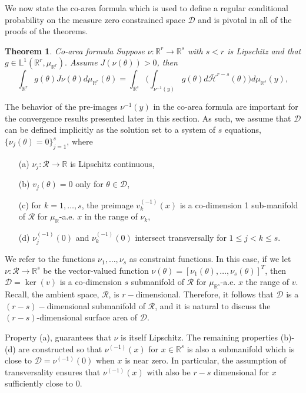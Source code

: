 \documentclass[10pt,fleqn]{article} \pdfoutput=1
\newtheorem{theorem}{Theorem} \newtheorem{lemma}{Lemma}
\DeclareMathOperator{\1}{\mathbbm{1}} \DeclareMathOperator{\bigO}{\mc O}
\begin{document}
We now state the co-area formula which is used to define a regular
conditional probability on the measure zero constrained space $\mathcal{D}$
and is pivotal in all of the proofs of the theorems.
\begin{theorem}{Co-area formula \citep{diaconis2013manifold,
			federer2014geometric}} Suppose $\nu:\mathbb{R}^r\to\mathbb{R}^s$
	with $ s<r$ is Lipschitz and that
	$g\in\mathbb{L}^1(\mathbb{R}^r,\mu_{\mathbb{R}^r}).$ Assume
	$J(\nu(\theta))>0$, then \begin{equation} \int_{\mathbb{R}^r}
		g(\theta)J\nu(\theta)d\mu_{\mathbb{R}^r}( \theta)=
		\int_{\mathbb{R}^s} \bigg( \int_{\nu^{-1}(y)}g(\theta)
		d\bar{\mathcal{H}}^{r-s}(\theta)\bigg)d\mu_{\mathbb{R}^s}(y),
	\end{equation} \end{theorem} The behavior of the pre-images
$\nu^{-1}(y)$ in the co-area formula are important for the
convergence results presented later in this section.  As such, we assume that $\mathcal{D}$ can be defined implicitly as the
solution set to a system of $s$ equations,  $\{\nu_j(\theta)=0\}_{j=1}^s$,
where \begin{itemize} \item[(a)] $\nu_j:\mathcal{R}\to\mathbb{R}$ is
	      Lipschitz continuous, \item[(b)] $v_j(\theta)=0$ only for
	      $\theta\in\mathcal{D}$, \item[(c)] for $k=1,\dots, s$, the preimage
	      $v_k^{(-1)}(x)$ is a co-dimension 1 sub-manifold of $\mathcal{R}$
	      for $\mu_\mathbb{R}$-a.e. $x$ in the range of $\nu_k$, \item[(d)]
	      $\nu_j^{(-1)}(0)$ and $\nu_k^{(-1)}(0)$ intersect transversally for
	      $1\le j<k\le s.$ \end{itemize} We refer to the functions
$\nu_1,\dots,\nu_s$ as constraint functions. In this case, if we
let $\nu:\mathcal{R}\to \mathbb{R}^s$ be the vector-valued function
$\nu(\theta) = [\nu_1(\theta),\dots,\nu_s(\theta)]^T$, then
$\mathcal{D} = \ker(v)$ is a co-dimension $s$ submanifold of
$\mathcal{R}$ for $\mu_{\mathbb{R}^s}$-a.e. $x$ the range of $v.$
Recall, the ambient space, $\mathcal{R}$, is $r-$dimensional.
Therefore, it follows that $\mathcal{D}$ is a $(r-s)-$dimensional
submanifold of $\mathcal{R}$, and it is natural to discuss the
$(r-s)$-dimensional surface area of $\mathcal{D}.$

Property (a), guarantees that $\nu$ is itself Lipschitz.  The remaining
properties (b)-(d) are constructed so that $\nu^{(-1)}(x)$ for
$x\in\mathbb{R}^s$ is also a submanifold which is close to
$\mathcal{D}=\nu^{(-1)}(0)$ when $x$ is near zero.  In particular, the
assumption of transversality ensures that $\nu^{(-1)}(x)$ with also be
$r-s$ dimensional for $x$ sufficiently close to 0.
\end{document}
